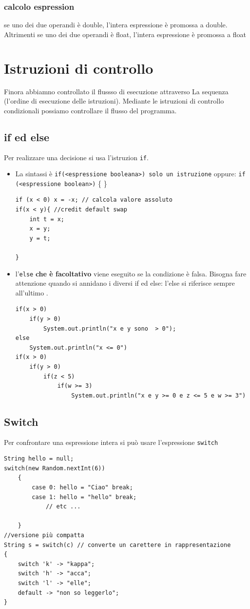 \documentclass[11pt]{article}
\begin{document}
\subsubsection{calcolo espression}
\label{sec:orgab2f96b}
se uno dei due operandi è double, l'intera espressione è promossa a double. Altrimenti se uno dei due operandi è float, l'intera espressione è promossa a float
\section{Istruzioni di controllo}
\label{sec:org3ad6d93}
Finora abbiamno controllato il flussso di esecuzione attraverso La sequenza (l'ordine di esecuzione delle istruzioni). Mediante le istruzioni di controllo condizionali possiamo controllare il flusso del programma.
\subsection{if ed else}
\label{sec:org084de92}
Per realizzare una decisione si usa l'istruzion \texttt{if}.
\begin{itemize}
\item La sintassi è \texttt{if(<espressione booleana>) solo un istruzione}
oppure:
\texttt{if (<espressione boolean>)} \{
\}

\begin{verbatim}
if (x < 0) x = -x; // calcola valore assoluto
if(x < y){ //credit default swap
    int t = x;
    x = y;
    y = t;

}
\end{verbatim}
\item l'\texttt{else} \textbf{che è facoltativo} viene eseguito se la condizione è falsa. Bisogna fare attenzione quando si annidano i diversi if ed else: l'else si riferisce sempre all'ultimo .
\begin{verbatim}
if(x > 0)
    if(y > 0)
        System.out.println("x e y sono  > 0");
else
    System.out.println("x <= 0")
if(x > 0)
    if(y > 0)
        if(z < 5)
            if(w >= 3)
                System.out.println("x e y >= 0 e z <= 5 e w >= 3")
\end{verbatim}
\end{itemize}
\subsection{Switch}
\label{sec:org5425616}
Per confrontare una espressione intera si può usare l'espressione \texttt{switch}
\begin{verbatim}
String hello = null;
switch(new Random.nextInt(6))
    {
        case 0: hello = "Ciao" break;
        case 1: hello = "hello" break;
            // etc ...

    }
//versione più compatta
String s = switch(c) // converte un carettere in rappresentazione
{
    switch 'k' -> "kappa";
    switch 'h' -> "acca";
    switch 'l' -> "elle";
    default -> "non so leggerlo";
}
\end{verbatim}
\end{document}
